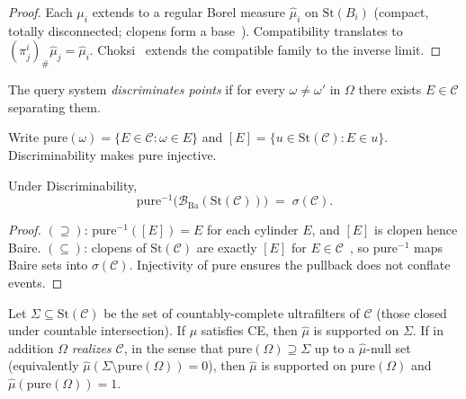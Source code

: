 \begin{proof}
Each $\mu_i$ extends to a regular Borel measure $\hat{\mu}_i$ on
$\mathrm{St}(B_i)$ (compact, totally disconnected; clopens form a
base~\cite{cardona2025, Halmos1950}).  Compatibility
translates to $(\pi_j^i)_\# \hat{\mu}_j = \hat{\mu}_i$.
Choksi~\cite[Theorem~1]{choksi1958} extends the compatible family to
the inverse limit.
\end{proof}

\begin{definition}[Discriminability]
\label{I:def:discriminability}
The query system \emph{discriminates points} if for every
$\omega \neq \omega'$ in $\Omega$ there exists $E \in \mathcal{C}$
separating them.
\end{definition}

\noindent Write
$\mathrm{pure}(\omega) = \{E \in \mathcal{C} : \omega \in E\}$ and
$[E] = \{u \in \mathrm{St}(\mathcal{C}) : E \in u\}$.
Discriminability makes $\mathrm{pure}$ injective.

\begin{proposition}
\label{I:prop:B1}
Under Discriminability,
\[
  \mathrm{pure}^{-1}\!\bigl(\mathcal{B}_{\mathrm{Ba}}(\mathrm{St}(\mathcal{C}))\bigr)
  \;=\; \sigma(\mathcal{C}).
\]
\end{proposition}

\begin{proof}
$(\supseteq)$: $\mathrm{pure}^{-1}([E]) = E$ for each cylinder $E$, and
$[E]$ is clopen hence Baire.
$(\subseteq)$: clopens of $\mathrm{St}(\mathcal{C})$ are exactly $[E]$
for $E \in \mathcal{C}$~\cite[I.3.2]{johnstone1982}, so
$\mathrm{pure}^{-1}$ maps Baire sets into $\sigma(\mathcal{C})$.
Injectivity of $\mathrm{pure}$ ensures the pullback does not conflate
events.
\end{proof}

\begin{proposition}
\label{I:prop:B2}
Let $\Sigma \subseteq \mathrm{St}(\mathcal{C})$ be the set of
countably-complete ultrafilters of $\mathcal{C}$ (those closed under
countable intersection).  If $\mu$ satisfies CE, then $\hat{\mu}$ is
supported on $\Sigma$.  If in addition $\Omega$ \emph{realizes
$\mathcal{C}$}, in the sense that
$\mathrm{pure}(\Omega) \supseteq \Sigma$ up to a $\hat{\mu}$-null set
\textup{(}equivalently $\hat{\mu}(\Sigma \setminus \mathrm{pure}(\Omega)) = 0$\textup{)},
then $\hat{\mu}$ is supported on $\mathrm{pure}(\Omega)$ and
$\hat{\mu}(\mathrm{pure}(\Omega)) = 1$.
\end{proposition}

